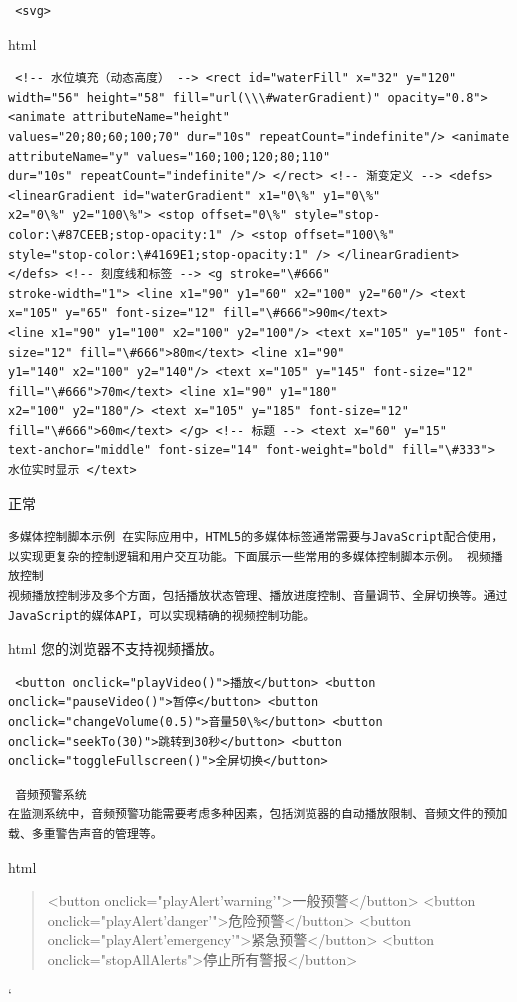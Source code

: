 \begin{lstlisting} <svg> \end{lstlisting} html \begin{verbatim} <!-- 水位填充（动态高度） --> <rect id="waterFill" x="32" y="120"
width="56" height="58" fill="url(\\\#waterGradient)" opacity="0.8"> <animate attributeName="height"
values="20;80;60;100;70" dur="10s" repeatCount="indefinite"/> <animate attributeName="y" values="160;100;120;80;110"
dur="10s" repeatCount="indefinite"/> </rect> <!-- 渐变定义 --> <defs> <linearGradient id="waterGradient" x1="0\%" y1="0\%"
x2="0\%" y2="100\%"> <stop offset="0\%" style="stop-color:\#87CEEB;stop-opacity:1" /> <stop offset="100\%"
style="stop-color:\#4169E1;stop-opacity:1" /> </linearGradient> </defs> <!-- 刻度线和标签 --> <g stroke="\#666"
stroke-width="1"> <line x1="90" y1="60" x2="100" y2="60"/> <text x="105" y="65" font-size="12" fill="\#666">90m</text>
<line x1="90" y1="100" x2="100" y2="100"/> <text x="105" y="105" font-size="12" fill="\#666">80m</text> <line x1="90"
y1="140" x2="100" y2="140"/> <text x="105" y="145" font-size="12" fill="\#666">70m</text> <line x1="90" y1="180"
x2="100" y2="180"/> <text x="105" y="185" font-size="12" fill="\#666">60m</text> </g> <!-- 标题 --> <text x="60" y="15"
text-anchor="middle" font-size="14" font-weight="bold" fill="\#333"> 水位实时显示 </text> \end{verbatim} 正常 \begin{lstlisting}
多媒体控制脚本示例 在实际应用中，HTML5的多媒体标签通常需要与JavaScript配合使用，以实现更复杂的控制逻辑和用户交互功能。下面展示一些常用的多媒体控制脚本示例。 视频播放控制
视频播放控制涉及多个方面，包括播放状态管理、播放进度控制、音量调节、全屏切换等。通过JavaScript的媒体API，可以实现精确的视频控制功能。 \end{lstlisting} html 您的浏览器不支持视频播放。
\begin{verbatim} <button onclick="playVideo()">播放</button> <button onclick="pauseVideo()">暂停</button> <button
onclick="changeVolume(0.5)">音量50\%</button> <button onclick="seekTo(30)">跳转到30秒</button> <button
onclick="toggleFullscreen()">全屏切换</button> \end{verbatim} \begin{lstlisting} 音频预警系统
在监测系统中，音频预警功能需要考虑多种因素，包括浏览器的自动播放限制、音频文件的预加载、多重警告声音的管理等。 \end{lstlisting} html \begin{quote}
 <button
onclick="playAlert'warning'">一般预警</button> <button onclick="playAlert'danger'">危险预警</button> <button
onclick="playAlert'emergency'">紧急预警</button> <button onclick="stopAllAlerts">停止所有警报</button> 
\end{quote} `
